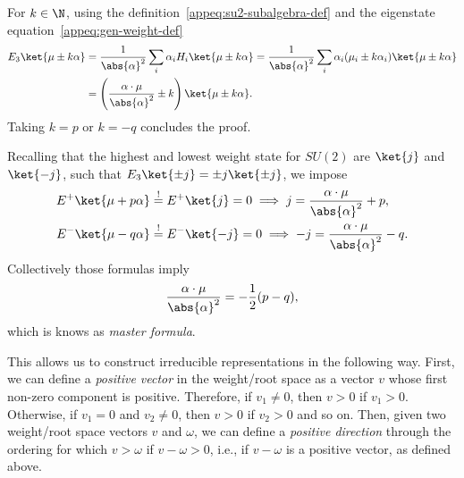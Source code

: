 \begin{mdframed}
\begin{innerproof}
    For $k \in \N$, using the definition~\eqref{appeq:su2-subalgebra-def} and the eigenstate equation~\eqref{appeq:gen-weight-def}
    \begin{equation*}
    \begin{split}
        E_3 \ket{\mu \pm k \alpha} &= \frac{1}{\abs{\alpha}^2} \sum_i \alpha_i H_i \ket{\mu \pm k \alpha} = \frac{1}{\abs{\alpha}^2} \sum_i \alpha_i (\mu_i \pm k \alpha_i) \ket{\mu \pm k \alpha}\\ 
        &= \left( \frac{\alpha \cdot \mu}{\abs{\alpha}^2} \pm k \right) \ket{\mu \pm k \alpha} .
    \end{split}
    \end{equation*}
   Taking $k = p$ or $k= -q$ concludes the proof.
\end{innerproof}
\end{mdframed}

Recalling that the highest and lowest weight state for $SU(2)$ are $\ket{j}$ and $\ket{-j}$, such that $E_3 \ket{\pm j} = \pm j \ket{\pm j}$, we impose
\begin{subequations}
\begin{align}
    E^+ \ket{\mu + p\alpha} &\overset{\mathrm{!}}{=} E^+ \ket{j} = 0  \implies j = \frac{\alpha \cdot \mu}{\abs{\alpha}^2} + p, \\
    E^- \ket{\mu - q\alpha} &\overset{\mathrm{!}}{=} E^- \ket{-j} = 0 \implies -j = \frac{\alpha \cdot \mu}{\abs{\alpha}^2} -q . 
\end{align}
\end{subequations}
Collectively those formulas imply
\begin{equation}\label{eq:master-formula}
    \frac{\alpha \cdot \mu}{\abs{\alpha}^2} = -\frac{1}{2}(p-q) ,
\end{equation}
which is knows as \emph{master formula}.

This allows us to construct irreducible representations in the following way. First, we can define a \emph{positive vector} in the weight/root space as a vector $v$ whose first non-zero component is positive. Therefore, if $v_1 \neq 0$, then $v > 0$ if $v_1 > 0$. Otherwise, if $v_1 = 0$ and $v_2 \neq 0$, then $v > 0$ if $v_2 > 0$ and so on. Then, given two weight/root space vectors $v$ and $\omega$, we can define a \emph{positive direction} through the ordering for which $v > \omega$ if $v - \omega > 0$, i.e., if $v-\omega$ is a positive vector, as defined above.

